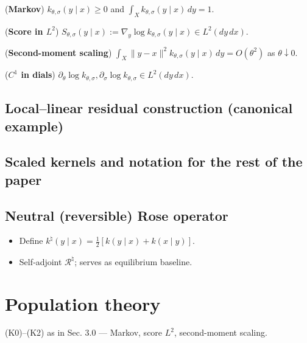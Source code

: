 		\begin{assumptionlist}[label=(K\arabic*)]
			\item \label{K0} (\textbf{Markov}) $k_{\theta,\sigma}(y\mid x)\ge0$ and $\int_X k_{\theta,\sigma}(y\mid x)\,dy = 1$.

			\item \label{K1} (\textbf{Score in $L^{2}$}) $S_{\theta,\sigma}(y\mid x):=\nabla_y\log k_{\theta,\sigma}(y\mid x) \in L^{2}(dy\,dx)$.
		
			\item \label{K2} (\textbf{Second-moment scaling}) $\displaystyle\int_X\|y-x\|^{2}k_{\theta,\sigma}(y\mid x)\,dy = O(\theta^{2})$ as $\theta\downarrow 0$.

			\item \label{K3} (\textbf{$C^{1}$ in dials}) $\partial_\theta\log k_{\theta,\sigma},  \partial_\sigma\log k_{\theta,\sigma}\in L^{2}(dy\,dx)$.
		\end{assumptionlist}
	
  	\subsection{Local–linear residual construction (canonical example)}
	
 	\subsection{Scaled kernels and notation for the rest of the paper}
	
	\subsection{Neutral (reversible) Rose operator}
	
		\begin{itemize}[nosep,leftmargin=*]
      			\item Define $k^{\natural}(y\mid x)=\tfrac12[k(y\mid x)+k(x\mid y)]$.
      			\item Self‑adjoint \(\mathcal R^{\natural}\); serves as equilibrium baseline.
    		\end{itemize}

\section{Population theory}
  	\begin{assumptionbox}
    		(K0)–(K2) as in Sec. 3.0 — Markov, score $L^2$, second-moment scaling.
 	 \end{assumptionbox}

